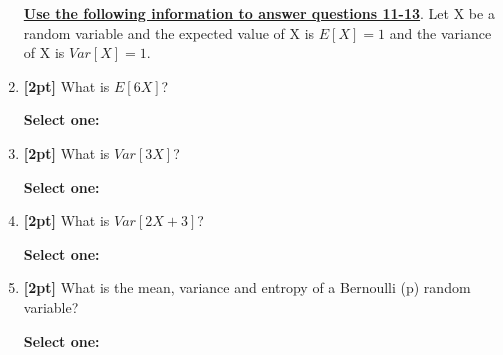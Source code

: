 \documentclass[12pt]{article}
\renewcommand{\circle}{\tikz\draw[black] (0,0) circle (1ex);}
\begin{document}
\begin{enumerate}
    
    
    \bigskip\bigskip\bigskip
    \textbf{\underline{Use the following information to answer questions 11-13}}. Let X be a random variable and the expected value of X is $E[X] = 1$ and the variance of X is $Var[X] = 1$. 

    \item \textbf{[2pt]} What is $E[6X]$?

    \textbf{Select one:}



    \item \textbf{[2pt]} What is $Var[3X]$?

    \textbf{Select one:}



    \item \textbf{[2pt]} What is $Var[2X + 3]$?

    \textbf{Select one:}



\clearpage
    \item \textbf{[2pt]} What is the mean, variance and entropy of a Bernoulli (p) random variable?
    
    \textbf{Select one:}
    



\end{enumerate}
\end{document}
